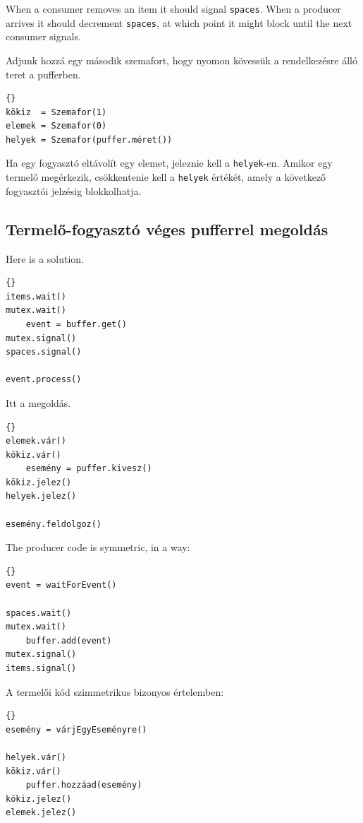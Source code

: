 \documentclass{book}
\newcommand{\clearemptydoublepage}{\newpage\cleardoublepage}
\begin{document}
When a consumer removes an item it should signal {\tt spaces}.
When a producer arrives it should decrement {\tt spaces}, at
which point it might block until the next consumer signals.

Adjunk hozzá egy második szemafort, hogy nyomon kövessük a
rendelkezésre álló teret a pufferben.

\begin{lstlisting}[title={Termelő-fogyasztó véges pufferrel inicializáció}]{}
kökiz  = Szemafor(1)
elemek = Szemafor(0)
helyek = Szemafor(puffer.méret())
\end{lstlisting}

Ha egy fogyasztó eltávolít egy elemet, jeleznie kell a {\tt helyek}-en.
Amikor egy termelő megérkezik, csökkentenie kell a {\tt helyek} értékét,
amely a következő fogyasztói jelzésig blokkolhatja.


\clearemptydoublepage
\subsection{Termelő-fogyasztó véges pufferrel megoldás}

Here is a solution.

\begin{lstlisting}[title={Finite buffer consumer solution}]{}
items.wait()
mutex.wait()
    event = buffer.get()
mutex.signal()
spaces.signal()

event.process()
\end{lstlisting}

Itt a megoldás.

\begin{lstlisting}[title={Véges puferrű fogyasztó megoldás}]{}
elemek.vár()
kökiz.vár()
    esemény = puffer.kivesz()
kökiz.jelez()
helyek.jelez()

esemény.feldolgoz()
\end{lstlisting}

The producer code is symmetric, in a way:

\begin{lstlisting}[title={Finite buffer producer solution}]{}
event = waitForEvent()

spaces.wait()
mutex.wait()
    buffer.add(event)
mutex.signal()
items.signal()
\end{lstlisting}

A termelői kód szimmetrikus bizonyos értelemben:

\begin{lstlisting}[title={Véges puferrű fogyasztó megoldás}]{}
esemény = várjEgyEseményre()

helyek.vár()
kökiz.vár()
    puffer.hozzáad(esemény)
kökiz.jelez()
elemek.jelez()
\end{lstlisting}
\end{document}
